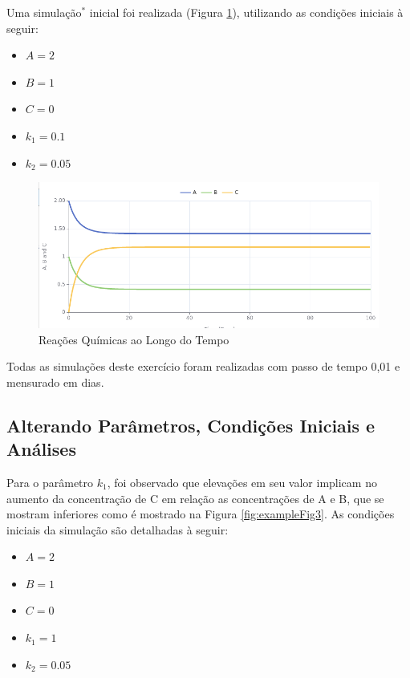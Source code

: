 \documentclass[a4paper, 12pt]{article}
\begin{document}
Uma simulação\(^*\) inicial foi realizada (Figura \ref{fig:exampleFig2}), utilizando as condições iniciais à seguir:

\begin{itemize}
    \item \(A = 2\)
    \item \(B = 1\)
    \item \(C = 0\)
    \item \(k_1 = 0.1\)
    \item \(k_2 = 0.05\)
\end{itemize}

\begin{figure}[H]
    \centering
    \includegraphics[width=1\textwidth]{Images/Exercise 1/vanilla.png}
    \caption{Reações Químicas ao Longo do Tempo}
    \label{fig:exampleFig2}
\end{figure}

\noindent * Todas as simulações deste exercício foram realizadas com passo de tempo 0,01 e mensurado em dias.

\subsection*{Alterando Parâmetros, Condições Iniciais e Análises}

Para o parâmetro \(k_1\), foi observado que elevações em seu valor implicam no aumento da concentração de C em relação as concentrações de A e B, que se mostram inferiores como é mostrado na Figura \ref{fig:exampleFig3}. As condições iniciais da simulação são detalhadas à seguir:

\begin{itemize}
    \item \(A = 2\)
    \item \(B = 1\)
    \item \(C = 0\)
    \item \(k_1 = 1\)
    \item \(k_2 = 0.05\)
\end{itemize}
\end{document}
